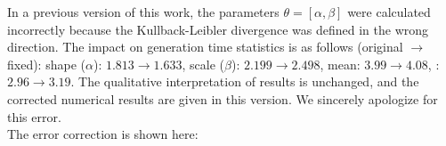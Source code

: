In a previous version of this work,
the parameters $\theta = [\alpha, \beta]$ were calculated incorrectly
because the Kullback-Leibler divergence was defined in the wrong direction.
The impact on generation time statistics is as follows (original $\rightarrow$ fixed):
shape ($\alpha$): $1.813 \rightarrow 1.633$,
scale ($\beta$): $2.199 \rightarrow 2.498$,
mean: $3.99 \rightarrow 4.08$,
\sd: $2.96 \rightarrow 3.19$.
The qualitative interpretation of results is unchanged,
and the corrected numerical results are given in this version.
We sincerely apologize for this error.\\
The error correction is shown here:
\scriptsize{}
